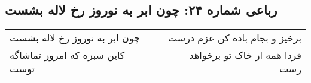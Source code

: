 \begin{center}
\section*{رباعی شماره ۲۴: چون ابر به نوروز رخ لاله بشست}
\label{sec:sh024}
\begin{longtable}{l p{0.5cm} r}
چون ابر به نوروز رخ لاله بشست
&&
برخیز و بجام باده کن عزم درست
\\
کاین سبزه که امروز تماشاگه توست
&&
فردا همه از خاک تو برخواهد رست
\\
\end{longtable}
\end{center}
